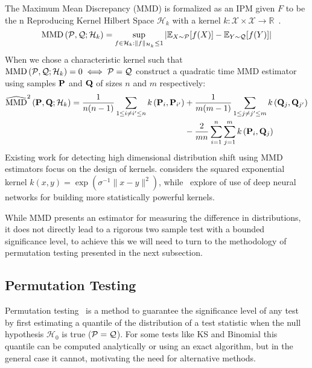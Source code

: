 The Maximum Mean Discrepancy (MMD) is formalized as an IPM given $F$ to be the n Reproducing Kernel Hilbert Space $\mathcal{H}_k$ with a kernel $k: \mathcal{X}\times \mathcal{X} \to \mathbb{R}$~\citep{twosampletestingbackground}.
\begin{equation*}
    \operatorname{MMD}\left(\mathcal{P}, \mathcal{Q} ; \mathcal{H}_k\right) = \sup _{f \in \mathcal{H}_k:\|f\|_{\mathcal{H}_k} \leq 1}\left|\mathbb{E}_{X \sim \mathcal{P}}[f(X)]-\mathbb{E}_{Y \sim \mathcal{Q}}[f(Y)]\right|
\end{equation*}
When we chose a characteristic kernel such that $\operatorname{MMD}\left(\mathcal{P}, \mathcal{Q} ; \mathcal{H}_k\right)=0\iff \mathcal{P}=\mathcal{Q}$ \citeauthor{gretton2012kernel} construct a quadratic time MMD estimator using samples $\mathbf{P}$ and $\mathbf{Q}$ of sizes $n$ and $m$ respectively:
\begin{equation}
    \begin{aligned}
        \widehat{\mathrm{MMD}}^2\left(\mathbf{P}, \mathbf{Q} ; \mathcal{H}_k\right) = \frac{1}{n(n-1)} \sum_{1 \leq i \neq i^{\prime} \leq n} k\left(\mathbf{P}_i, \mathbf{P}_{i^{\prime}}\right) &+\frac{1}{m(m-1)} \sum_{1 \leq j \neq j^{\prime} \leq m} k\left(\mathbf{Q}_j, \mathbf{Q}_{j^{\prime}}\right) \\
        &-\frac{2}{m n} \sum_{i=1}^n \sum_{j=1}^m k\left(\mathbf{P}_i, \mathbf{Q}_j\right)
    \end{aligned}
\end{equation}
Existing work for detecting high dimensional distribution shift using MMD estimators focus on the design of kernels.
\citeauthor{failloud} considers the squared exponential kernel $k(x, y)=\exp{\left(\sigma^{-1} \|x-y\|^2\right)}$, while~\citeauthor{liu2020learning} explore of use of deep neural networks for building more statistically powerful kernels.

While MMD presents an estimator for measuring the difference in distributions, it does not directly lead to a rigorous two sample test with a bounded significance level, to achieve this we will need to turn to the methodology of permutation testing presented in the next subsection.

\subsection*{Permutation Testing}
Permutation testing~\citep{fisher_1991} is a method to guarantee the significance level of any test by first estimating a quantile of the distribution of a test statistic when the null hypothesis $\mathcal{H}_0$ is true ($\mathcal{P}=\mathcal{Q}$).
For some tests like KS and Binomial this quantile can be computed analytically or using an exact algorithm, but in the general case it cannot, motivating the need for alternative methods.

